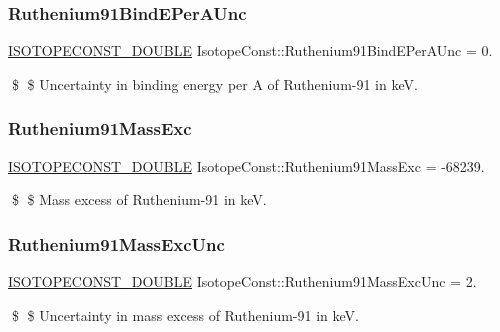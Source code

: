 \subsubsection{\texorpdfstring{Ruthenium91\+Bind\+E\+Per\+A\+Unc}{Ruthenium91BindEPerAUnc}}
{\footnotesize\ttfamily \mbox{\hyperlink{group___isotope_const-_macros_ga8f45a7272ce02c0b4c65c44636ed719a}{I\+S\+O\+T\+O\+P\+E\+C\+O\+N\+S\+T\+\_\+\+D\+O\+U\+B\+LE}} Isotope\+Const\+::\+Ruthenium91\+Bind\+E\+Per\+A\+Unc = 0.}

\$ \$ Uncertainty in binding energy per A of Ruthenium-\/91 in keV. \mbox{\label{group___isotope_const-_ruthenium-_ru91_ga445bf575c99c96857451fd49070fa667}} 
\subsubsection{\texorpdfstring{Ruthenium91\+Mass\+Exc}{Ruthenium91MassExc}}
{\footnotesize\ttfamily \mbox{\hyperlink{group___isotope_const-_macros_ga8f45a7272ce02c0b4c65c44636ed719a}{I\+S\+O\+T\+O\+P\+E\+C\+O\+N\+S\+T\+\_\+\+D\+O\+U\+B\+LE}} Isotope\+Const\+::\+Ruthenium91\+Mass\+Exc = -\/68239.}

\$ \$ Mass excess of Ruthenium-\/91 in keV. \mbox{\label{group___isotope_const-_ruthenium-_ru91_ga9cbbf4c64f40ccd3061d6040c6e38c77}} 
\subsubsection{\texorpdfstring{Ruthenium91\+Mass\+Exc\+Unc}{Ruthenium91MassExcUnc}}
{\footnotesize\ttfamily \mbox{\hyperlink{group___isotope_const-_macros_ga8f45a7272ce02c0b4c65c44636ed719a}{I\+S\+O\+T\+O\+P\+E\+C\+O\+N\+S\+T\+\_\+\+D\+O\+U\+B\+LE}} Isotope\+Const\+::\+Ruthenium91\+Mass\+Exc\+Unc = 2.}

\$ \$ Uncertainty in mass excess of Ruthenium-\/91 in keV. \mbox{\label{group___isotope_const-_ruthenium-_ru91_gae0fb5e0eb27559201e6bc97afbfccdbc}} 
